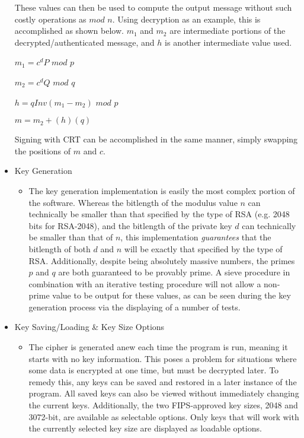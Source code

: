 \documentclass[11pt]{article}
\begin{document}
\begin{itemize}
{\begin{itemize}
{These values can then be used to compute the output message without such costly operations as $mod$ $n$. Using decryption as an example, this is accomplished as shown below. $m_1$ and $m_2$ are intermediate portions of the decrypted/authenticated message, and $h$ is another intermediate value used.

\begin{center}
$m_1 = c^dP$ $mod$ $p$

$m_2 = c^dQ$ $mod$ $q$

$h = qInv(m_1 - m_2)$ $mod$ $p$

$m = m_2 + (h)(q)$
\end{center}

Signing with CRT can be accomplished in the same manner, simply swapping the positions of $m$ and $c$.
	}
	\end{itemize}
}
\item
{Key Generation
	\begin{itemize}
	\item
	{The key generation implementation is easily the most complex portion of the software. Whereas the bitlength of the modulus value $n$ can technically be smaller than that specified by the type of RSA (e.g. 2048 bits for RSA-2048), and the bitlength of the private key $d$ can technically be smaller than that of $n$, this implementation \textit{guarantees} that the bitlength of both $d$ and $n$ will be exactly that specified by the type of RSA. Additionally, despite being absolutely massive numbers, the primes $p$ and $q$ are both guaranteed to be provably prime. A sieve procedure in combination with an iterative testing procedure will not allow a non-prime value to be output for these values, as can be seen during the key generation process via the displaying of a number of tests.
	}
	\end{itemize}
}
\item
{Key Saving/Loading \& Key Size Options
	\begin{itemize}
	\item
	{The cipher is generated anew each time the program is run, meaning it starts with no key information. This poses a problem for situations where some data is encrypted at one time, but must be decrypted later. To remedy this, any keys can be saved and restored in a later instance of the program. All saved keys can also be viewed without immediately changing the current keys. Additionally, the two FIPS-approved key sizes, 2048 and 3072-bit, are available as selectable options. Only keys that will work with the currently selected key size are displayed as loadable options.
}
\end{itemize}}
\end{itemize}
\end{document}
